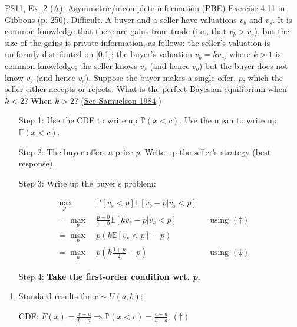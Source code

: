 \begin{frame}{PS11, Ex. 2 (A): Asymmetric/incomplete information (PBE)}
    Exercise 4.11 in Gibbons (p. 250). Difficult. A buyer and a seller have valuations $v_b$ and $v_s$. It is common knowledge that there are gains from trade (i.e., that $v_b > v_s$), but the size of the gains is private information, as follows: the seller’s valuation is uniformly distributed on [0,1]; the buyer’s valuation $v_b = kv_s$, where $k > 1$ is common knowledge; the seller knows $v_s$ (and hence $v_b$) but the buyer does not know $v_b$ (and hence $v_s$). Suppose the buyer makes a single offer, $p$, which the seller either accepts or rejects. What is the perfect Bayesian equilibrium when $k < 2$? When $k > 2$? (\href{https://www.jstor.org/stable/1911195}{See Samuelson 1984}.) \vspace{-8pt}
    \begin{multicols}{2}
      \begin{itemize}
        \item[Step 1:] Use the CDF to write up $\mathbb{P}(x<c)$. Use the mean to write up $\mathbb{E}(x<c)$.
        \item[Step 2:] The buyer offers a price \textit{p}. Write up the seller's strategy (best response).
        \item[Step 3:] Write up the buyer's problem:
      \end{itemize} \vspace{-8pt}
      \begin{align*}
         \displaystyle{\max_p}&\ \mathbb{P}[v_s<p]\mathbb{E}[v_b-p|v_s<p]\\
        =\displaystyle{\max_p}&\ \frac{p-0}{1-0}\mathbb{E}[kv_s-p|v_s<p]&&\text{using }(\dagger)\\
        =\displaystyle{\max_p}&\ p\left(k\mathbb{E}[v_s<p]-p\right)\\
        =\displaystyle{\max_p}&\ p\left(k\frac{0+p}{2}-p\right)&&\text{using }(\ddagger)
      \end{align*} \vspace{-8pt}
      \begin{itemize}
        \item[Step 4:] \textbf{Take the first-order condition wrt. \textit{p}.}
      \end{itemize}
      \vfill\null\columnbreak
      \begin{enumerate}
        \item Standard results for $x\sim U(a, b):$
        \item[CDF:] $F(x)=\frac{x-a}{b-a}\Rightarrow\mathbb{P}(x<c)=\frac{c-a}{b-a}\ \ (\dagger)$

\end{enumerate}
\end{multicols}
\end{frame}
